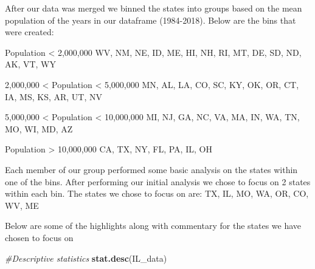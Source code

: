 \documentclass[
]{article}
\newenvironment{Shaded}{\begin{snugshade}}{\end{snugshade}}
\newcommand{\CommentTok}[1]{\textcolor[rgb]{0.56,0.35,0.01}{\textit{#1}}}
\newcommand{\KeywordTok}[1]{\textcolor[rgb]{0.13,0.29,0.53}{\textbf{#1}}}
\newcommand{\NormalTok}[1]{#1}
\newcommand{\OperatorTok}[1]{\textcolor[rgb]{0.81,0.36,0.00}{\textbf{#1}}}
\newcommand{\StringTok}[1]{\textcolor[rgb]{0.31,0.60,0.02}{#1}}
\begin{document}
After our data was merged we binned the states into groups based on the
mean population of the years in our dataframe (1984-2018). Below are the
bins that were created:

Population \textless{} 2,000,000 WV, NM, NE, ID, ME, HI, NH, RI, MT, DE,
SD, ND, AK, VT, WY

2,000,000 \textless{} Population \textless{} 5,000,000 MN, AL, LA, CO,
SC, KY, OK, OR, CT, IA, MS, KS, AR, UT, NV

5,000,000 \textless{} Population \textless{} 10,000,000 MI, NJ, GA, NC,
VA, MA, IN, WA, TN, MO, WI, MD, AZ

Population \textgreater{} 10,000,000 CA, TX, NY, FL, PA, IL, OH

Each member of our group performed some basic analysis on the states
within one of the bins. After performing our initial analysis we chose
to focus on 2 states within each bin. The states we chose to focus on
are: TX, IL, MO, WA, OR, CO, WV, ME

Below are some of the highlights along with commentary for the states we
have chosen to focus on

\begin{Shaded}
\end{Shaded}

\begin{Shaded}
\begin{Highlighting}[]
\CommentTok{#Descriptive statistics}
\KeywordTok{stat.desc}\NormalTok{(IL_data)}
\end{Highlighting}
\end{Shaded}
\end{document}
